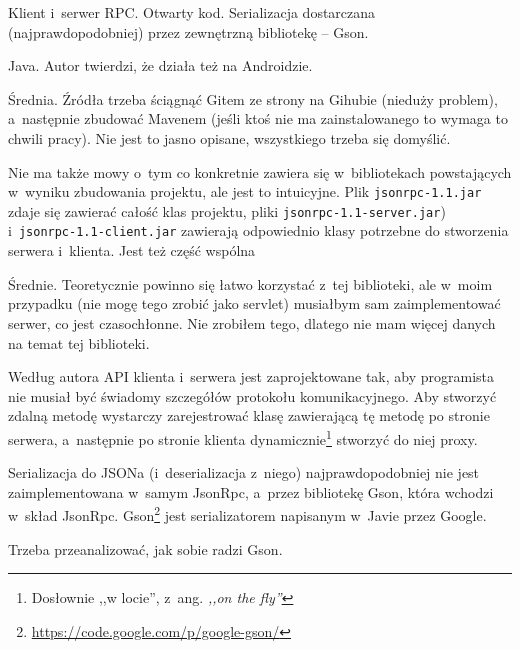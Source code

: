 \begin{description}
Klient i~serwer RPC. Otwarty kod. Serializacja dostarczana (najprawdopodobniej) przez zewnętrzną bibliotekę -- Gson.

Java. Autor twierdzi, że działa też na Androidzie.

Średnia.
Źródła trzeba ściągnąć Gitem ze strony na Gihubie (nieduży problem), a~następnie zbudować Mavenem (jeśli ktoś nie ma zainstalowanego to wymaga to chwili pracy). Nie jest to jasno opisane, wszystkiego trzeba się domyślić.

Nie ma także mowy o~tym co konkretnie zawiera się w~bibliotekach powstających w~wyniku zbudowania projektu, ale jest to intuicyjne. Plik \texttt{jsonrpc-1.1.jar} zdaje się zawierać całość klas projektu, pliki \texttt{jsonrpc-1.1-server.jar}) i~\texttt{jsonrpc-1.1-client.jar} zawierają odpowiednio klasy potrzebne do stworzenia serwera i~klienta. Jest też część wspólna 

Średnie. Teoretycznie powinno się łatwo korzystać z~tej biblioteki, ale w~moim przypadku (nie mogę tego zrobić jako servlet) musiałbym sam zaimplementować serwer, co jest czasochłonne.
Nie zrobiłem tego, dlatego nie mam więcej danych na temat tej biblioteki.

Według autora API klienta i~serwera jest zaprojektowane tak, aby programista nie musiał być świadomy szczegółów protokołu komunikacyjnego.
Aby stworzyć zdalną metodę wystarczy zarejestrować klasę zawierającą tę metodę po stronie serwera, a~następnie po stronie klienta dynamicznie\footnote{Dosłownie ,,w locie'', z~ang. \emph{,,on the fly''}} stworzyć do niej proxy.










Serializacja do JSONa (i~deserializacja z~niego) najprawdopodobniej nie jest zaimplementowana w~samym JsonRpc, a~przez bibliotekę Gson, która wchodzi w~skład JsonRpc. Gson\footnote{\url{https://code.google.com/p/google-gson/}} jest serializatorem napisanym w~Javie przez Google.

Trzeba przeanalizować, jak sobie radzi Gson.

\end{description}

